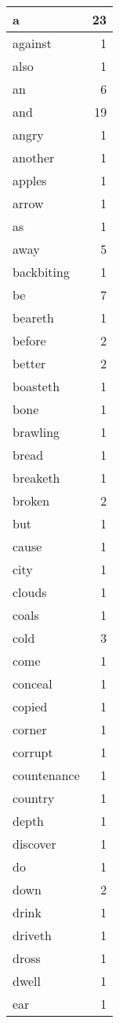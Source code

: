 \begin{center}
\begin{longtable}{l|r}
a & 23\\ \hline 
against & 1\\ \hline 
also & 1\\ \hline 
an & 6\\ \hline 
and & 19\\ \hline 
angry & 1\\ \hline 
another & 1\\ \hline 
apples & 1\\ \hline 
arrow & 1\\ \hline 
as & 1\\ \hline 
away & 5\\ \hline 
backbiting & 1\\ \hline 
be & 7\\ \hline 
beareth & 1\\ \hline 
before & 2\\ \hline 
better & 2\\ \hline 
boasteth & 1\\ \hline 
bone & 1\\ \hline 
brawling & 1\\ \hline 
bread & 1\\ \hline 
breaketh & 1\\ \hline 
broken & 2\\ \hline 
but & 1\\ \hline 
cause & 1\\ \hline 
city & 1\\ \hline 
clouds & 1\\ \hline 
coals & 1\\ \hline 
cold & 3\\ \hline 
come & 1\\ \hline 
conceal & 1\\ \hline 
copied & 1\\ \hline 
corner & 1\\ \hline 
corrupt & 1\\ \hline 
countenance & 1\\ \hline 
country & 1\\ \hline 
depth & 1\\ \hline 
discover & 1\\ \hline 
do & 1\\ \hline 
down & 2\\ \hline 
drink & 1\\ \hline 
driveth & 1\\ \hline 
dross & 1\\ \hline 
dwell & 1\\ \hline 
ear & 1\\ \hline 

\end{longtable}
\end{center}

